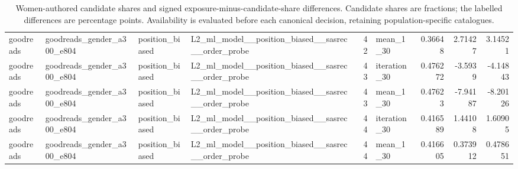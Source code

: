 \begin{table}[htbp!]
\begin{tabular}{llllrlrrr}
goodreads & goodreads\_gender\_a300\_e804 & position\_biased & L2\_ml\_model\_\_position\_biased\_\_sasrec\_\_order\_probe & 42 & mean\_1\_30 & 0.36648 & 2.71427 & 3.14521 \\
goodreads & goodreads\_gender\_a300\_e804 & position\_biased & L2\_ml\_model\_\_position\_biased\_\_sasrec\_\_order\_probe & 43 & iteration\_30 & 0.476272 & -3.5939 & -4.14843 \\
goodreads & goodreads\_gender\_a300\_e804 & position\_biased & L2\_ml\_model\_\_position\_biased\_\_sasrec\_\_order\_probe & 43 & mean\_1\_30 & 0.47623 & -7.94187 & -8.20126 \\
goodreads & goodreads\_gender\_a300\_e804 & position\_biased & L2\_ml\_model\_\_position\_biased\_\_sasrec\_\_order\_probe & 44 & iteration\_30 & 0.416589 & 1.44108 & 1.60905 \\
goodreads & goodreads\_gender\_a300\_e804 & position\_biased & L2\_ml\_model\_\_position\_biased\_\_sasrec\_\_order\_probe & 44 & mean\_1\_30 & 0.416605 & 0.373912 & 0.478651 \\
\hline
\end{tabular}
\caption{Women-authored candidate shares and signed exposure-minus-candidate-share differences. Candidate shares are fractions; the labelled differences are percentage points. Availability is evaluated before each canonical decision, retaining population-specific catalogues.}
\label{chap:results:tab:rq7_candidate_availability_summaries}
\end{table}
